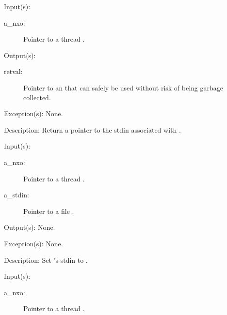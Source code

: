 \begin{capi}
	\begin{capilist}
	\item[Input(s): ]
		\begin{description}\item[]
		\item[a\_nxo: ]
			Pointer to a thread .
		\end{description}
	\item[Output(s): ]
		\begin{description}\item[]
		\item[retval: ]
			Pointer to an  that can safely be used
			without risk of being garbage collected.
		\end{description}
	\item[Exception(s): ] None.
	\item[Description: ]
		Return a pointer to the stdin associated with .
	\end{capilist}
\label{nxo_thread_stdin_set}
	\begin{capilist}
	\item[Input(s): ]
		\begin{description}\item[]
		\item[a\_nxo: ]
			Pointer to a thread \classname{nxo}.
		\item[a\_stdin: ]
			Pointer to a file \classname{nxo}.
		\end{description}
	\item[Output(s): ] None.
	\item[Exception(s): ] None.
	\item[Description: ]
		Set 's stdin to \cvar{a\_stdin}.
	\end{capilist}
\label{nxo_thread_stdout_get}
	\begin{capilist}
	\item[Input(s): ]
		\begin{description}\item[]
		\item[a\_nxo: ]
			Pointer to a thread .
		\end{description}

\end{capilist}
\end{capi}
